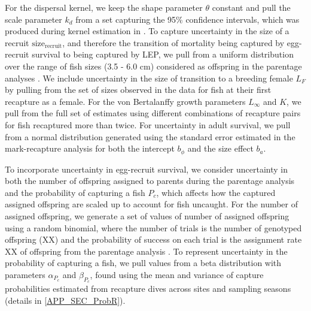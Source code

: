 \documentclass[12pt, oneside]{article}   	%
\begin{document}
For the dispersal kernel, we keep the shape parameter $\theta$ constant and pull the scale parameter $k_d$ from a set capturing the 95\% confidence intervals, which was produced during kernel estimation in \citep{catalanoInPrepconnectivity}. To capture uncertainty in the size of a recruit $\text{size}_\text{recruit}$, and therefore the transition of mortality being captured by egg-recruit survival to being captured by LEP, we pull from a uniform distribution over the range of fish sizes (3.5 - 6.0 cm) considered as offspring in the parentage analyses \citep{catalanoInPrepconnectivity}. We include uncertainty in the size of transition to a breeding female $L_F$ by pulling from the set of sizes observed in the data for fish at their first recapture as a female. For the von Bertalanffy growth parameters $L_\infty$ and $K$, we pull from the full set of estimates using different combinations of recapture pairs for fish recaptured more than twice. For uncertainty in adult survival, we pull from a normal distribution generated using the standard error estimated in the mark-recapture analysis for both the intercept $b_\phi$ and the size effect $b_a$.

To incorporate uncertainty in egg-recruit survival, we consider uncertainty in both the number of offspring assigned to parents during the parentage analysis and the probability of capturing a fish $P_c$, which affects how the captured assigned offspring are scaled up to account for fish uncaught. For the number of assigned offspring, we generate a set of values of number of assigned offspring using a random binomial, where the number of trials is the number of genotyped offspring (XX) and the probability of success on each trial is the assignment rate XX of offspring from the parentage analysis \citep{catalanoInPrepconnectivity}. To represent uncertainty in the probability of capturing a fish, we pull values from a beta distribution with parameters $\alpha_{P_c}$ and $\beta_{P_c}$, found using the mean and variance of capture probabilities estimated from recapture dives across sites and sampling seasons (details in \ref{APP_SEC_ProbR}). 


\end{document}
